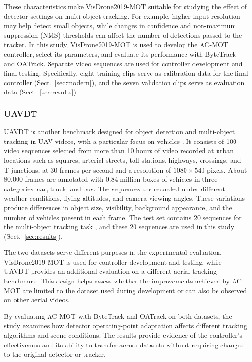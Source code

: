 \documentclass[pdflatex,sn-mathphys-num,iicol]{sn-jnl}
\begin{document}
These characteristics make VisDrone2019-MOT suitable for studying the effect of detector settings on multi-object tracking. For example, higher input resolution may help detect small objects, while changes in confidence and non-maximum suppression (NMS) thresholds can affect the number of detections passed to the tracker. In this study, VisDrone2019-MOT is used to develop the AC-MOT controller, select its parameters, and evaluate its performance with ByteTrack and OATrack. Separate video sequences are used for controller development and final testing. Specifically, eight training clips
serve as calibration data for the final controller (Sect.~\ref{sec:modern}),
and the seven validation clips serve as evaluation data
(Sect.~\ref{sec:results}).

\subsubsection{UAVDT}
UAVDT is another benchmark designed for object detection and multi-object
tracking in UAV videos, with a particular focus on vehicles \cite{du2018uavdt}.
It consists of 100 video sequences selected from more than 10 hours of video
recorded at urban locations such as squares, arterial streets, toll stations,
highways, crossings, and T-junctions, at 30 frames per second and a resolution
of $1080\times540$ pixels. About 80,000 frames are annotated with 0.84 million
boxes of vehicles in three categories: car, truck, and bus. The sequences are
recorded under different weather conditions, flying altitudes, and camera
viewing angles. These variations produce differences in object size,
visibility, background appearance, and the number of vehicles present in each
frame. The test set contains 20 sequences for the multi-object tracking task
\cite{du2018uavdt}, and these 20 sequences are used in this study
(Sect.~\ref{sec:results}).

The two datasets serve different purposes in the experimental evaluation. VisDrone2019-MOT is used for controller development and testing, while UAVDT provides an additional evaluation on a different aerial tracking benchmark. This design helps assess whether the improvements achieved by AC-MOT are limited to the dataset used during development or can also be observed on other aerial videos.

By evaluating AC-MOT with ByteTrack and OATrack on both datasets, the study examines how detector operating-point adaptation affects different tracking algorithms and scene conditions. The results provide evidence of the controller's effectiveness and its ability to transfer across datasets without requiring changes to the original detector or tracker.
\end{document}

